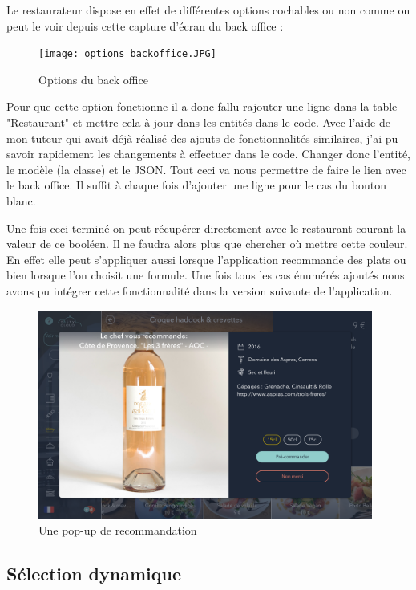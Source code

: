 Le restaurateur dispose en effet de différentes options cochables ou non comme on peut le voir depuis cette capture d'écran du back office :

\begin{figure}[!htb]
  \centering
  \texttt{[image: options\_backoffice.JPG]}
  \caption{Options du back office}
  \label{fig:boat1}
\end{figure}

Pour que cette option fonctionne il a donc fallu rajouter une ligne dans la table "Restaurant" et mettre cela à jour dans les entités dans le code. Avec l'aide de mon tuteur qui avait déjà réalisé des ajouts de fonctionnalités similaires, j'ai pu savoir rapidement les changements à effectuer dans le code. Changer donc l'entité, le modèle (la classe) et le JSON. Tout ceci va nous permettre de faire le lien avec le back office. Il suffit à chaque fois d'ajouter une ligne pour le cas du bouton blanc. 

Une fois ceci terminé on peut récupérer directement avec le restaurant courant la valeur de ce booléen. Il ne faudra alors plus que chercher où mettre cette couleur. En effet elle peut s'appliquer aussi lorsque l'application recommande des plats ou bien lorsque l'on choisit une formule. Une fois tous les cas énumérés ajoutés nous avons pu intégrer cette fonctionnalité dans la version suivante de l'application.

\begin{figure}[!htb]
  \centering
  \includegraphics[width=110mm,scale=0.5]{images/couleur_bouton4.png}
  \caption{Une pop-up de recommandation}
  \label{fig:boat1}
\end{figure}

\subsection{Sélection dynamique}

